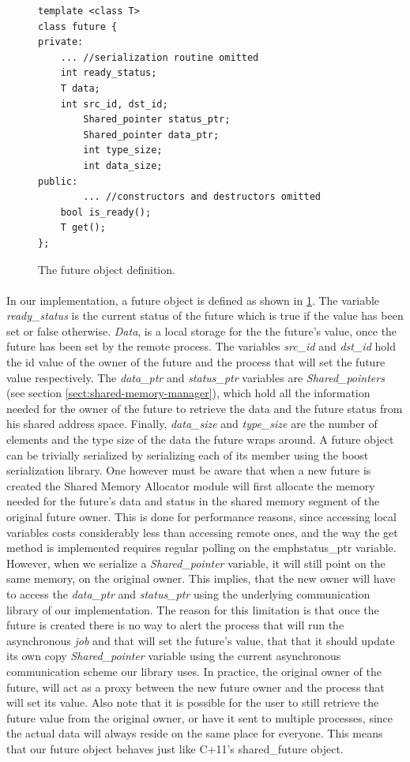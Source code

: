 \begin{figure}[!ht]
\begin{lstlisting}
template <class T>
class future {
private:
	... //serialization routine omitted
    int ready_status;
    T data;
    int src_id, dst_id;
		Shared_pointer status_ptr;
		Shared_pointer data_ptr;
		int type_size;
		int data_size;
public:
		... //constructors and destructors omitted
    bool is_ready();
    T get();
};
\end{lstlisting}
\caption{The future object definition.}
\label{lst:future_object}
\end{figure}

\paragraph{}
In our implementation, a future object is defined as shown in \ref{lst:future_object}.
The variable \emph{ready\_status} is the current
status of the future which is true if the value has been set or false otherwise.  \emph{Data}, is a local storage for the
the future's value, once the future has been set by the remote process.  The variables \emph{src\_id} and \emph{dst\_id}
hold the id value of the owner of the future and the process that will set the future value respectively.  
The \emph{data\_ptr} and \emph{status\_ptr} variables are \emph{Shared\_pointers} (see section \ref{sect:shared-memory-manager}),
which hold all the
information needed for the owner of the future to retrieve the data and the future status from his shared address space. 
Finally, \emph{data\_size} and \emph{type\_size} are the number of elements and the
type size of the data the future wraps around.  A future object can be trivially serialized by serializing each
of its member using the boost serialization library.  One however must be aware that when a new future is created
the Shared Memory Allocator module will first allocate the memory needed for the future's data and status in the 
shared memory segment of the original future owner.  This is done for performance reasons, since accessing local
variables costs considerably less than accessing remote ones, and the way the get method is implemented requires 
regular polling on the emph{status\_ptr} variable.  However, when we serialize a \emph{Shared\_pointer} variable,
it will still point on the same memory, on the original owner.  This implies, that the new owner will have to 
access the \emph{data\_ptr} and \emph{status\_ptr} using the underlying communication library of our implementation.
The reason for this limitation is that once the future is created there is no way to alert the process that will
run the asynchronous \emph{job} and that will set the future's value, that that it should update its own copy \emph{Shared\_pointer}
variable using the current asynchronous communication scheme our library uses.  In practice, the original owner of the
future, will act as a proxy between the new future owner and the process that will set its value.  Also note that it is
possible for the user to still retrieve the future value from the original owner, or have it sent to multiple
processes, since the actual data will always reside on the same place for everyone.  This means that our future 
object behaves just like C+11's shared\_future object. 

